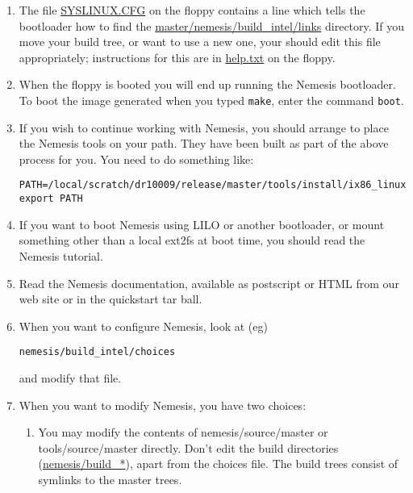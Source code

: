 \documentclass[a4paper]{article}
\newcommand{\cmd}[1]{\texttt{#1}}
\newcommand{\file}[1]{\url{#1}}
\newcommand{\dir}[1]{\url{#1}}
\begin{document}
\begin{enumerate}
\item The file \file{SYSLINUX.CFG} on the floppy contains a line
which tells the bootloader how to find the
\dir{master/nemesis/build_intel/links} directory. If you move your build
tree, or want to use a new one, your should edit this file
appropriately; instructions for this are in \file{help.txt} on the
floppy.

\item When the floppy is booted you will end up running the Nemesis
bootloader. To boot the image generated when you typed \cmd{make},
enter the command \cmd{boot}.

\item If you wish to continue working with Nemesis, you should arrange
to place the Nemesis tools on your path. They have been built as part
of the above process for you. You need to do something like:

\begin{verbatim}
PATH=/local/scratch/dr10009/release/master/tools/install/ix86_linux_rh5.1/bin:$PATH
export PATH
\end{verbatim}%

\item If you want to boot Nemesis using LILO or another bootloader, or
mount something other than a local ext2fs at boot time, you should
read the Nemesis tutorial.

\item Read the Nemesis documentation, available as postscript or HTML
from our web site or in the quickstart tar ball.

\item When you want to configure Nemesis, look at (eg)
\begin{verbatim}
nemesis/build_intel/choices 
\end{verbatim}
and modify that file.


\item When you want to modify Nemesis, you have two choices:

\begin{enumerate}
\item You may modify the contents of nemesis/source/master or
 tools/source/master directly. Don't edit the build
 directories (\dir{nemesis/build_*}), apart from the choices file. The build
 trees consist of symlinks to the master trees.


\end{enumerate}
\end{enumerate}
\end{document}
